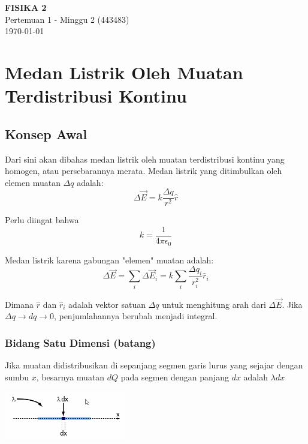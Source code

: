 \documentclass[twocolumn, 11pt]{article}%
\begin{document}
\begin{strip}
  \vspace*{\dimexpr-\stripsep}
  \begin{center}
      \Large\textbf{FISIKA 2}\\
      \large{Pertemuan 1 - Minggu 2 (443483)}\\
      \large{\today}
   \end{center}
\end{strip}

\section{Medan Listrik Oleh Muatan Terdistribusi Kontinu}
    \subsection{Konsep Awal}
    Dari sini akan dibahas medan listrik oleh muatan terdistribusi kontinu yang homogen, atau persebarannya merata. Medan listrik yang ditimbulkan oleh elemen muatan $\Delta q$ adalah:
    \[ \Delta \vec E = k \frac{\Delta q}{r^2} \hat r \]

    Perlu diingat bahwa
    \[k = \frac1{4\pi \epsilon_0}\]

    Medan listrik karena gabungan "elemen" muatan adalah:
    \[ \Delta \vec E = \sum_i \Delta \vec E_i = k \sum_i \frac{\Delta q_i}{r_i^2} \hat r_i \]
    
    Dimana $\hat r$ dan $\hat r_i$ adalah vektor satuan $\Delta q$ untuk menghitung arah dari $\Delta \vec E$. Jika $\Delta q \rightarrow dq \rightarrow 0$, penjumlahannya berubah menjadi integral.\\

    \subsubsection{Bidang Satu Dimensi (batang)}%
    Jika muatan didistribusikan di sepanjang segmen garis lurus yang sejajar dengan sumbu $x$, besarnya muatan $dQ$ pada segmen dengan panjang $dx$ adalah $\lambda dx$
    \begin{center}
        \includegraphics[width=200px]{1.png}
    \end{center}
\end{document}
